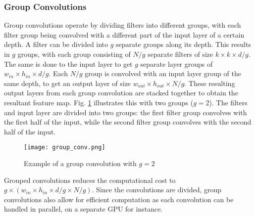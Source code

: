 \documentclass[conference]{IEEEtran}
\begin{document}
\subsubsection{Group Convolutions}
Group convolutions \cite{krizhevsky2012imagenet} operate by dividing filters into different groups, with each filter group being convolved with a different part of the input layer of a certain depth. A filter can be divided into $g$ separate groups along its depth. This results in $g$ groups, with each group consisting of $N/g$ separate filters of size $k \times k \times d/g$. The same is done to the input layer to get $g$ separate layer groups of $w_{in} \times h_{in} \times d/g$. Each $N/g$ group is convolved with an input layer group of the same depth, to get an output layer of size $w_{out} \times h_{out} \times N/g$. These resulting output layers from each group convolution are stacked together to obtain the resultant feature map. Fig. \ref{fig:groupconv} illustrates this with two groups ($g=2$). The filters and input layer are divided into two groups: the first filter group convolves with the first half of the input, while the second filter group convolves with the second half of the input.
\begin{figure}
\begin{center}
\texttt{[image: group\_conv.png]}
\end{center}
\caption{Example of a group convolution with $g=2$}
\label{fig:groupconv}
\end{figure}
Grouped convolutions reduces the computational cost to $g \times (w_{in} \times h_{in} \times d/g \times N/g)$. Since the convolutions are divided, group convolutions also allow for efficient computation as each convolution can be handled in parallel, on a separate GPU for instance.
\end{document}
